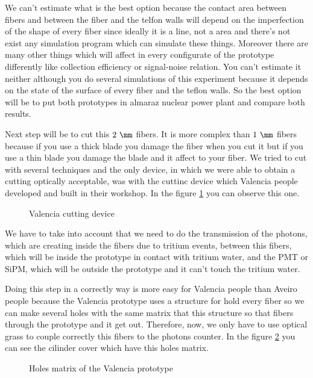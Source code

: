 We can't estimate what is the best option because the contact area between fibers and between the fiber and the telfon walls will depend on the imperfection of the shape of every fiber since ideally it is a line, not a area and there's not exist any simulation program which can simulate these things. Moreover there are many other things which will affect in every configurate of the prototype differently like collection efficiency or signal-noise relation. You can't estimate it neither although you do several simulations of this experiment because it depends on the state of the surface of every fiber and the teflon walls. So the best option will be to put both prototypes in almaraz nuclear power plant and compare both results.

Next step will be to cut this $2~\mm$ fibers. It is more complex than $1~\mm$ fibers because if you use a thick blade you damage the fiber when you cut it but if you use a thin blade you damage the blade and it affect to your fiber. We tried to cut with several techniques and the only device, in which we were able to obtain a cutting optically acceptable, was with the cuttinc device which Valencia people developed and built in their workshop. In the figure \ref{cuttingdevice} you can observe this one.

\begin{figure}[hbtp]
 \centering
 \caption{Valencia cutting device \label{cuttingdevice}}
\end{figure}

We have to take into account that we need to do the transmission of the photons, which are creating inside the fibers due to tritium events, between this fibers, which will be inside the prototype in contact with tritium water, and the PMT or SiPM, which will be outside the prototype and it can't touch the tritium water. 

Doing this step in a correctly way is more easy for Valencia people than Aveiro people because the Valencia prototype uses a structure for hold every fiber so we can make several holes with the same matrix that this structure so that fibers through the prototype and it get out. Therefore, now, we only have to use optical grass to couple correctly this fibers to the photons counter. In the figure \ref{valenciaholes} you can see the cilinder cover which have this holes matrix.

\begin{figure}[hbtp]
 \centering
 \caption{Holes matrix of the Valencia prototype \label{valenciaholes}}
\end{figure}

